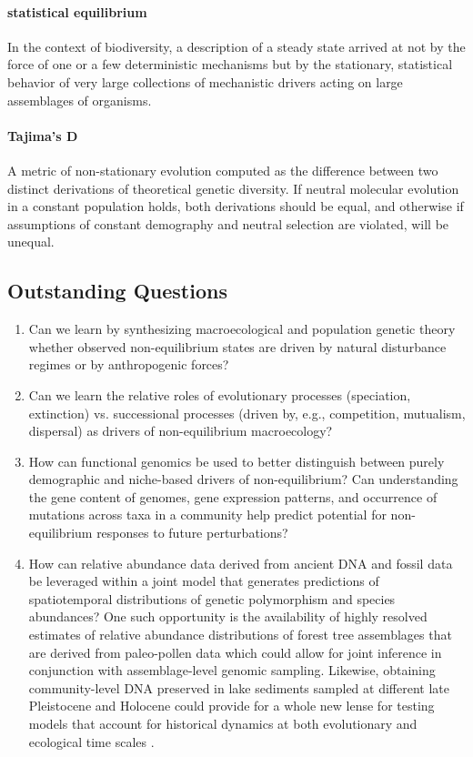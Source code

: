 \documentclass[12pt]{article}
\begin{document}
\paragraph{statistical equilibrium} In the context of biodiversity, a
description of a steady state arrived at not by the force of one or a
few deterministic mechanisms but by the stationary, statistical
behavior of very large collections of mechanistic drivers acting on
large assemblages of organisms.

\paragraph{Tajima's D} A metric of non-stationary evolution computed
as the difference between two distinct derivations of theoretical
genetic diversity. If neutral molecular evolution in a constant
population holds, both derivations should be equal, and otherwise if
assumptions of constant demography and neutral selection are violated,
will be unequal.

\subsection*{Outstanding Questions}

\begin{enumerate}
\item Can we learn by synthesizing macroecological and population
  genetic theory whether observed non-equilibrium states are driven by
  natural disturbance regimes or by anthropogenic forces? 
\item Can we learn the relative roles of evolutionary processes
  (speciation, extinction) vs. successional processes (driven by,
  e.g., competition, mutualism, dispersal) as drivers of
  non-equilibrium macroecology?
\item How can functional genomics be used to better distinguish
  between purely demographic and niche-based drivers of
  non-equilibrium? Can understanding the gene content of genomes, gene
  expression patterns, and occurrence of mutations across taxa in a
  community help predict potential for non-equilibrium responses to
  future perturbations?
\item How can relative abundance data derived from ancient DNA and
  fossil data be leveraged within a joint model that generates
  predictions of spatiotemporal distributions of genetic polymorphism
  and species abundances? One such opportunity is the availability of
  highly resolved estimates of relative abundance distributions of
  forest tree assemblages that are derived from paleo-pollen data
  \citep{dawson2016} which could allow for joint inference in
  conjunction with assemblage-level genomic sampling. Likewise,
  obtaining community-level DNA preserved in lake sediments sampled at
  different late Pleistocene and Holocene could provide for a whole
  new lense for testing models that account for historical dynamics at
  both evolutionary and ecological time scales \citep{capo2016}.
\end{enumerate}
\end{document}
